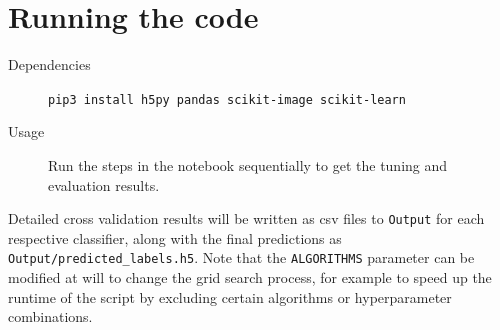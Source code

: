 \documentclass[landscape,twocolumn]{article}
\begin{document}
\printbibliography\appendix
\section{Running the code}
\begin{description}
	\item[Dependencies] \texttt{pip3 install h5py pandas scikit-image scikit-learn}
	\item[Usage] Run the steps in the notebook sequentially to get the tuning and evaluation results.
\end{description}

Detailed cross validation results will be written as csv files to \texttt{Output} for each respective classifier, along with the final predictions as \texttt{Output/predicted\_labels.h5}. Note that the \texttt{ALGORITHMS} parameter can be modified at will to change the grid search process, for example to speed up the runtime of the script by excluding certain algorithms or hyperparameter combinations.
\end{document}
